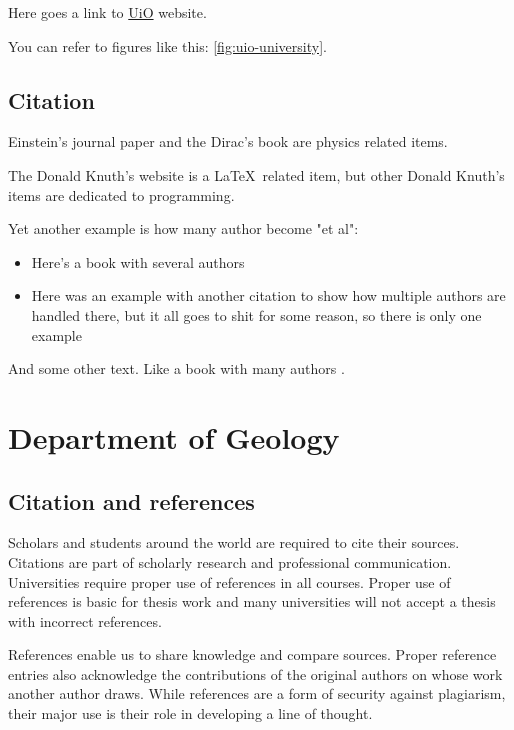 Here goes a link to \href{https://www.uio.no/}{UiO} website.

You can refer to figures like this: \autoref{fig:uio-university}.

\subsection{Citation}

Einstein's journal paper \citeyear{einstein1905} and the Dirac's book \cite[Chapter~2]{dirac1981} are physics related items.

The Donald Knuth's website \cite{knuth2016} is a \LaTeX\ related item, but other Donald Knuth's items \cite{knuth1973} are dedicated to programming.

Yet another example is how many author become "et al":

\begin{itemize}
    \item Here's a book with several authors \cite{gnomes}
    \item Here was an example with another citation to show how multiple authors are handled there, but it all goes to shit for some reason, so there is only one example
\end{itemize}

And some other text. Like a book with many authors \cite{FujiiYuka2018EBOP}.

\newpage

\section{Department of Geology}

\subsection{Citation and references}

Scholars and students around the world are required to cite their sources. Citations are part of scholarly research and professional communication. Universities require proper use of references in all courses. Proper use of references is basic for thesis work and many universities will not accept a thesis with incorrect references.

References enable us to share knowledge and compare sources. Proper reference entries also acknowledge the contributions of the original authors on whose work another author draws. While references are a form of security against plagiarism, their major use is their role in developing a line of thought.

